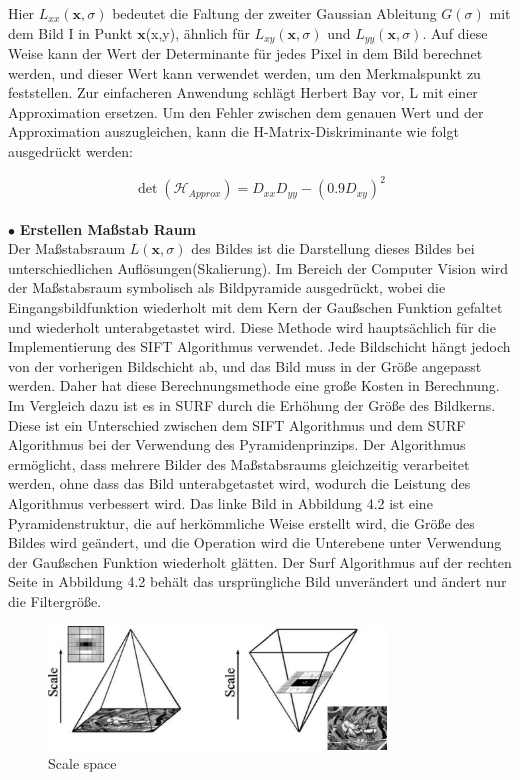 Hier $L_{xx}(\textbf{x},\sigma)$ bedeutet die Faltung der zweiter Gaussian Ableitung $G(\sigma)$ mit dem Bild I in Punkt $\textbf{x}$(x,y), ähnlich für $L_{xy}(\textbf{x},\sigma)$ und $L_{yy}(\textbf{x},\sigma)$. Auf diese Weise kann der Wert der Determinante für jedes Pixel in dem Bild berechnet werden, und dieser Wert kann verwendet werden, um den Merkmalspunkt zu feststellen.
Zur einfacheren Anwendung schlägt Herbert Bay\cite{Surf} vor, L mit einer Approximation ersetzen. Um den Fehler zwischen dem genauen Wert und der Approximation auszugleichen, kann die H-Matrix-Diskriminante wie folgt ausgedrückt werden:

\begin{equation}
   \det(\mathcal{H}_{Approx}) = D_{xx}D_{yy} - (0.9D_{xy})^2  
\end{equation}
\\
$\bullet$ \textbf{Erstellen Maßstab Raum}\\
Der Maßstabsraum $L(\textbf{x},\sigma)$ des Bildes ist die Darstellung dieses Bildes bei unterschiedlichen Auflösungen(Skalierung). Im Bereich der Computer Vision wird der Maßstabsraum symbolisch als Bildpyramide ausgedrückt, wobei die Eingangsbildfunktion wiederholt mit dem Kern der Gaußschen Funktion gefaltet und wiederholt unterabgetastet wird. Diese Methode wird hauptsächlich für die Implementierung des SIFT Algorithmus verwendet. Jede Bildschicht hängt jedoch von der vorherigen Bildschicht ab, und das Bild muss in der Größe angepasst werden. Daher hat diese Berechnungsmethode eine große Kosten in Berechnung. Im Vergleich dazu ist es in SURF durch die Erhöhung der Größe des Bildkerns. Diese ist ein Unterschied zwischen dem SIFT Algorithmus und dem SURF Algorithmus bei der Verwendung des Pyramidenprinzips.
Der Algorithmus ermöglicht, dass mehrere Bilder des Maßstabsraums gleichzeitig verarbeitet werden, ohne dass das Bild unterabgetastet wird, wodurch die Leistung des Algorithmus verbessert wird. Das linke Bild in Abbildung 4.2 ist eine Pyramidenstruktur, die auf herkömmliche Weise erstellt wird, die Größe des Bildes wird geändert, und die Operation wird die Unterebene  unter Verwendung der Gaußschen Funktion wiederholt glätten. Der Surf Algorithmus auf der rechten Seite in Abbildung 4.2 behält das ursprüngliche Bild unverändert und ändert nur die Filtergröße.

\begin{figure}[htb]
 \centering 
 \includegraphics[keepaspectratio,width=0.8\textwidth]{images/4_ZweiteErfahrung/Scale_space.pdf}
 \caption{Scale space}
 \label{fig:Scale space}
\end{figure} 


